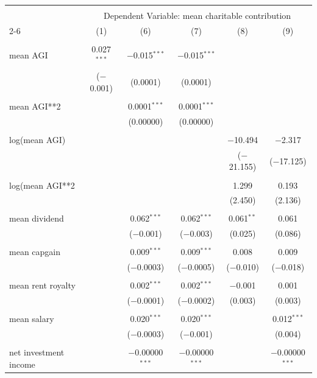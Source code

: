 \documentclass{article}
\begin{document}
\endgroup 

\begingroup 
\tiny 
\begin{tabular}{@{\extracolsep{.001pt}}lccccc} 
\\[-1.8ex]\hline 
\hline \\[-1.8ex] 
 & \multicolumn{5}{c}{Dependent Variable: mean charitable contribution} \\ 
\cline{2-6} 
 & (1) & (6) & (7) & (8) & (9) \\ 
\hline \\[-1.8ex] 
 mean AGI & 0.027$^{***}$ & $-$0.015$^{***}$ & $-$0.015$^{***}$ &  &  \\ 
  & ($-$0.001) & (0.0001) & (0.0001) &  &  \\ 
  & & & & & \\ 
 mean AGI**2 &  & 0.0001$^{***}$ & 0.0001$^{***}$ &  &  \\ 
  &  & (0.00000) & (0.00000) &  &  \\ 
  & & & & & \\ 
 log(mean AGI) &  &  &  & $-$10.494 & $-$2.317 \\ 
  &  &  &  & ($-$21.155) & ($-$17.125) \\ 
  & & & & & \\ 
 log(mean AGI**2 &  &  &  & 1.299 & 0.193 \\ 
  &  &  &  & (2.450) & (2.136) \\ 
  & & & & & \\ 
 mean dividend &  & 0.062$^{***}$ & 0.062$^{***}$ & 0.061$^{**}$ & 0.061 \\ 
  &  & ($-$0.001) & ($-$0.003) & (0.025) & (0.086) \\ 
  & & & & & \\ 
 mean capgain &  & 0.009$^{***}$ & 0.009$^{***}$ & 0.008 & 0.009 \\ 
  &  & ($-$0.0003) & ($-$0.0005) & ($-$0.010) & ($-$0.018) \\ 
  & & & & & \\ 
 mean rent royalty &  & 0.002$^{***}$ & 0.002$^{***}$ & $-$0.001 & 0.001 \\ 
  &  & ($-$0.0001) & ($-$0.0002) & (0.003) & (0.003) \\ 
  & & & & & \\ 
 mean salary &  & 0.020$^{***}$ & 0.020$^{***}$ &  & 0.012$^{***}$ \\ 
  &  & ($-$0.0003) & ($-$0.001) &  & (0.004) \\ 
  & & & & & \\ 
 net investment income &  & $-$0.00000$^{***}$ & $-$0.00000$^{***}$ &  & $-$0.00000$^{***}$ \\ 

\end{tabular}
\end{document}
